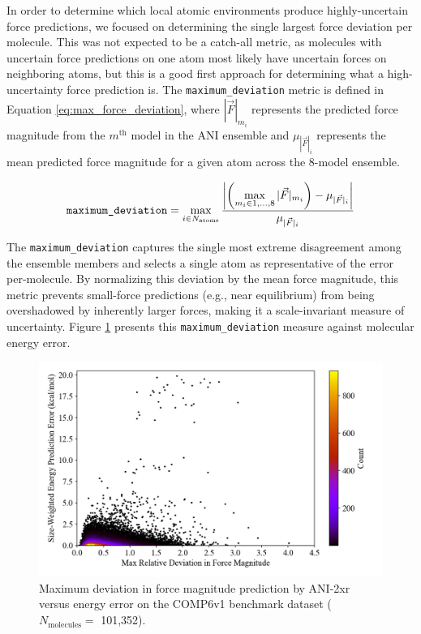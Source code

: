 In order to determine which local atomic environments produce highly-uncertain force predictions, we focused on determining the single largest force deviation per molecule.
This was not expected to be a catch-all metric, as molecules with uncertain force predictions on one atom most likely have uncertain forces on neighboring atoms, but this is a good first approach for determining what a high-uncertainty force prediction is.
The \verb|maximum_deviation| metric is defined in Equation \ref{eq:max_force_deviation}, where $|\vec{F}|_{m_i}$ represents the predicted force magnitude from the $m^{\text{th}}$ model in the ANI ensemble and $\mu_{|\vec{F}|_i}$ represents the mean predicted force magnitude for a given atom across the 8-model ensemble.

\begin{equation} 
\verb|maximum_deviation| = 
\max\limits_{i \in N_{\text{atoms}}}
\frac{\left| \left(\max\limits_{m_i \in {1, \dots, 8}} |\vec{F}|_{m_i} \right)- {\mu_{|\vec{F}|_i}} \right|}{\mu_{|\vec{F}|_i}} 
\label{eq:max_force_deviation}
\end{equation}

The \verb|maximum_deviation| captures the single most extreme disagreement among the ensemble members and selects a single atom as representative of the error per-molecule. 
By normalizing this deviation by the mean force magnitude, this metric prevents small-force predictions (e.g., near equilibrium) from being overshadowed by inherently larger forces, making it a scale-invariant measure of uncertainty.
Figure \ref{fig:2xr_comp6v1-forces-highest_deviation} presents this \verb|maximum_deviation| measure against molecular energy error. 

\begin{figure}[!h]
    \centering
    \includegraphics[width=1\linewidth]{Images/2xr_forces/2xr_comp6v1_force-highest-force_deviation-vs-energy.png}
    \caption[Maximum deviation in force magnitude prediction versus energy error (COMP6v1)]{Maximum deviation in force magnitude prediction by ANI-2xr versus energy error on the COMP6v1 benchmark dataset ($N_\text{molecules}=$ 101,352).}
    \label{fig:2xr_comp6v1-forces-highest_deviation}
\end{figure}

